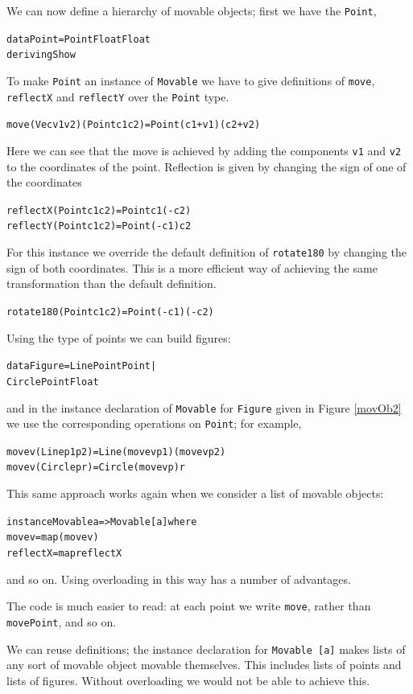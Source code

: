 We can now define a hierarchy of movable objects; first we have the 
\texttt{Point},
\begin{alltt}
data Point = Point Float Float
             deriving Show
\end{alltt}
To make \texttt{Point} an instance of \texttt{Movable} we have to give
definitions of \texttt{move}, \texttt{reflectX} and \texttt{reflectY}
over the \texttt{Point} type.
\begin{alltt}
move (Vec v1 v2) (Point c1 c2) = Point (c1+v1) (c2+v2)
\end{alltt}
Here we can see that the move is achieved by adding the components \texttt{v1}
and \texttt{v2} to the coordinates of the point.
Reflection is given by changing the sign of one of the coordinates
\begin{alltt}
reflectX (Point c1 c2) = Point c1 (-c2)
reflectY (Point c1 c2) = Point (-c1) c2
\end{alltt}
For this instance we
override the default definition of \texttt{rotate180} by changing the sign
of both coordinates. This is a more efficient way of achieving the same
transformation than the default definition.
\begin{alltt}
rotate180 (Point c1 c2) = Point (-c1) (-c2)
\end{alltt}
Using the type of points we can build figures:
\begin{alltt}
data Figure = Line Point Point |
              Circle Point Float
\end{alltt}
and in the instance declaration of \texttt{Movable} for \texttt{Figure} given in Figure
\ref{movOb2} we use the corresponding
operations on \texttt{Point}; for example,
\begin{alltt}
move v (Line p1 p2) = Line (move v p1) (move v p2)
move v (Circle p r) = Circle (move v p) r       
\end{alltt}
This same approach works again when we consider a list of movable objects:
\begin{alltt}
instance Movable a => Movable [a] where
  move v   = map (move v)
  reflectX = map reflectX
\end{alltt}
and so on. Using overloading in this way has a number of advantages.
\begin{titemize}
\item The code is much easier to read: at each point we write \texttt{move},
rather than \texttt{movePoint}, and so on.
\item We can reuse definitions; the instance declaration for 
\texttt{Movable [a]} makes lists of any sort of movable object movable themselves.
This includes lists of
points and lists of figures. Without overloading we would not be able to
achieve this.
\end{titemize}

